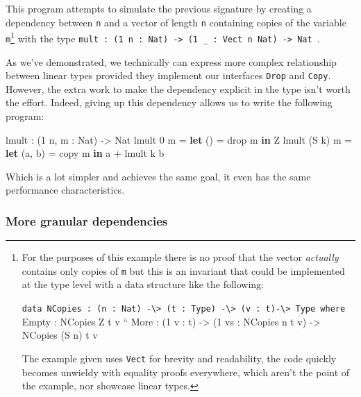 \documentclass[
]{article}
\newenvironment{Shaded}{}{}
\newcommand{\DataTypeTok}[1]{\textcolor[rgb]{0.56,0.13,0.00}{#1}}
\newcommand{\DecValTok}[1]{\textcolor[rgb]{0.25,0.63,0.44}{#1}}
\newcommand{\FunctionTok}[1]{\textcolor[rgb]{0.02,0.16,0.49}{#1}}
\newcommand{\KeywordTok}[1]{\textcolor[rgb]{0.00,0.44,0.13}{\textbf{#1}}}
\newcommand{\NormalTok}[1]{#1}
\newcommand{\OperatorTok}[1]{\textcolor[rgb]{0.40,0.40,0.40}{#1}}
\newcommand{\OtherTok}[1]{\textcolor[rgb]{0.00,0.44,0.13}{#1}}
\begin{document}
This program attempts to simulate the previous signature by creating a
dependency between \texttt{n} and a vector of length \texttt{n}
containing copies of the variable \texttt{m}\footnote{For the purposes
  of this example there is no proof that the vector \emph{actually}
  contains only copies of \texttt{m} but this is an invariant that could
  be implemented at the type level with a data structure like the
  following:

  \texttt{data\ NCopies\ :\ (n\ :\ Nat)\ -\textbackslash{}\textgreater{}\ (t\ :\ Type)\ -\textbackslash{}\textgreater{}\ (v\ :\ t)-\textbackslash{}\textgreater{}\ Type\ where}
  Empty : NCopies Z t v `` More : (1 v : t) -\textgreater{} (1 vs :
  NCopies n t v) -\textgreater{} NCopies (S n) t v

  The example given uses \texttt{Vect} for brevity and readability, the
  code quickly becomes unwieldy with equality proofs everywhere, which
  aren't the point of the example, nor showcase linear types.} with the
type
\texttt{mult\ :\ (1\ n\ :\ Nat)\ -\textgreater{}\ (1\ \_\ :\ Vect\ n\ Nat)\ -\textgreater{}\ Nat~}.

As we've demonstrated, we technically can express more complex
relationship between linear types provided they implement our interfaces
\texttt{Drop} and \texttt{Copy}. However, the extra work to make the
dependency explicit in the type isn't worth the effort. Indeed, giving
up this dependency allows us to write the following program:

\begin{Shaded}
\begin{Highlighting}[]
\NormalTok{lmult }\OperatorTok{:}\NormalTok{ (}\DecValTok{1}\NormalTok{ n, m }\OperatorTok{:} \DataTypeTok{Nat}\NormalTok{) }\OtherTok{{-}\textgreater{}} \DataTypeTok{Nat}
\NormalTok{lmult }\DecValTok{0}\NormalTok{ m }\OtherTok{=} \KeywordTok{let}\NormalTok{ () }\OtherTok{=} \FunctionTok{drop}\NormalTok{ m }\KeywordTok{in} \DataTypeTok{Z}
\NormalTok{lmult (}\DataTypeTok{S}\NormalTok{ k) m }\OtherTok{=} \KeywordTok{let}\NormalTok{ (a, b) }\OtherTok{=}\NormalTok{ copy m }\KeywordTok{in}\NormalTok{ a }\OperatorTok{+}\NormalTok{ lmult k b}
\end{Highlighting}
\end{Shaded}

Which is a lot simpler and achieves the same goal, it even has the same
performance characteristics.

\hypertarget{more-granular-dependencies}{%
\subsubsection{More granular
dependencies}\label{more-granular-dependencies}}
\end{document}
